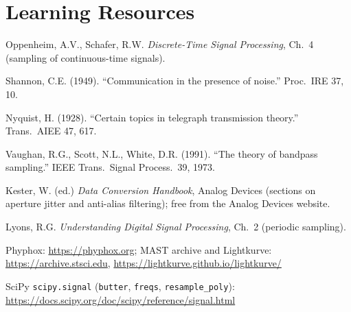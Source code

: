 \documentclass[11pt,a4paper]{article}
\begin{document}
\section*{Learning Resources}
\begin{resources}
  \item Oppenheim, A.V., Schafer, R.W. \emph{Discrete-Time Signal Processing}, Ch.~4 (sampling of continuous-time signals).
  \item Shannon, C.E. (1949). ``Communication in the presence of noise.'' Proc.\ IRE 37, 10.
  \item Nyquist, H. (1928). ``Certain topics in telegraph transmission theory.'' Trans.\ AIEE 47, 617.
  \item Vaughan, R.G., Scott, N.L., White, D.R. (1991). ``The theory of bandpass sampling.'' IEEE Trans.\ Signal Process.\ 39, 1973.
\end{resources}
\begin{resources}
  \item Kester, W. (ed.) \emph{Data Conversion Handbook}, Analog Devices (sections on aperture jitter and anti-alias filtering); free from the Analog Devices website.
  \item Lyons, R.G. \emph{Understanding Digital Signal Processing}, Ch.~2 (periodic sampling).
\end{resources}
\begin{resources}
  \item Phyphox: \url{https://phyphox.org}; MAST archive and Lightkurve: \url{https://archive.stsci.edu}, \url{https://lightkurve.github.io/lightkurve/}
  \item SciPy \texttt{scipy.signal} (\texttt{butter}, \texttt{freqs}, \texttt{resample\_poly}): \url{https://docs.scipy.org/doc/scipy/reference/signal.html}
\end{resources}

\evaluation
\end{document}
